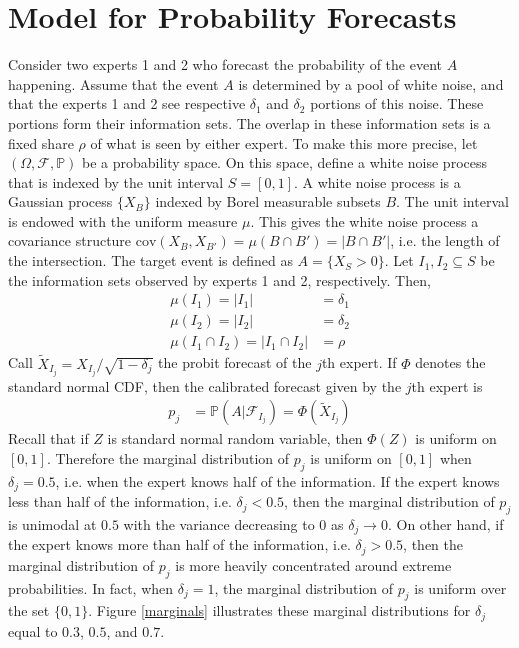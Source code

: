 \documentclass[11pt,twoside]{article}
\renewcommand{\P}{\mathbb{P}}
\begin{document}
\section{Model for Probability Forecasts}
\label{Model}
Consider two experts 1 and 2 who forecast the probability of the event $A$ happening. Assume that the event $A$ is determined by a pool of white noise, and that the experts 1 and 2 see respective $\delta_1$ and $\delta_2$ portions of this noise. These portions form their information sets. The overlap in these information sets is a fixed share $\rho$ of what is seen by either expert. To make this more precise, let $(\Omega, \mathcal{F}, \P)$ be a probability space. On this space, define a white noise process that is indexed by the unit interval $S = [0,1]$. A white noise process is a Gaussian process $\{ X_B \}$ indexed by Borel measurable subsets $B$. The unit interval is endowed with the uniform measure $\mu$. This gives the white noise process a covariance structure $\text{cov}(X_B, X_{B'}) = \mu(B \cap B') = |B \cap B'|$, i.e. the length of the intersection. The target event is defined as $A = \{ X_{S} > 0\}$. Let $I_1, I_2 \subseteq S$ be the information sets observed by experts 1 and 2, respectively. Then,
\begin{align*}
\mu(I_1) = |I_1| &= \delta_1\\
\mu(I_2) = |I_2| &= \delta_2\\
\mu(I_1 \cap I_2) =  |I_1 \cap I_2| &= \rho
\end{align*}
Call $\tilde{X}_{I_j} = X_{I_j}/\sqrt{1-\delta_j}$ the probit forecast of the $j$th expert.  If $\Phi$ denotes the standard normal CDF, then the calibrated forecast given by the $j$th expert is
\begin{align*}
p_j &= \P\left(A | \mathcal{F}_{I_j}\right) = \Phi\left( \tilde{X}_{I_j}\right)
\end{align*}
Recall that if $Z$ is standard normal random variable, then $\Phi(Z)$ is uniform on $[0,1]$. Therefore the marginal distribution of $p_j$ is uniform on $[0,1]$ when $\delta_j = 0.5$, i.e. when the expert knows half of the information. If the expert knows less than half of the information, i.e. $\delta_j < 0.5$, then the marginal distribution of $p_j$ is unimodal at $0.5$ with the variance decreasing to 0 as $\delta_j \to 0$. On other hand, if the expert knows more than half of the information, i.e. $\delta_j > 0.5$, then the marginal  distribution of $p_j$ is more heavily concentrated around extreme probabilities. In fact, when $\delta_j = 1$, the marginal distribution of $p_j$ is uniform over the set $\{0,1\}$. Figure \ref{marginals} illustrates these marginal distributions for $\delta_j$ equal to $0.3$, $0.5$, and $0.7$. 
\end{document}
